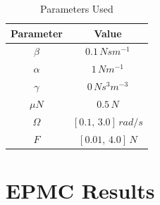 \documentclass[12pt]{article}
\begin{document}
\begin{table}[!h]
  \centering
  \caption{Parameters Used}
  \begin{tabular}[t]{c|c}
    \hline\hline
    \textbf{Parameter} & \textbf{Value}\\\hline
    $\beta$ & $0.1\,Ns m^{-1}$\\
    $\alpha$ & $1\, N m^{-1}$\\
    $\gamma$ & $0\, Ns^3 m^{-3}$\\
    $\mu N$ & $0.5\, N$\\
    $\Omega$ & $[0.1,\, 3.0]\, rad/s$\\
    $F$ & $[0.01,\, 4.0]\, N$\\
    \hline\hline
  \end{tabular}
\end{table}

\pagebreak

\section{EPMC Results}
\label{sec:epmc-results}
\end{document}
